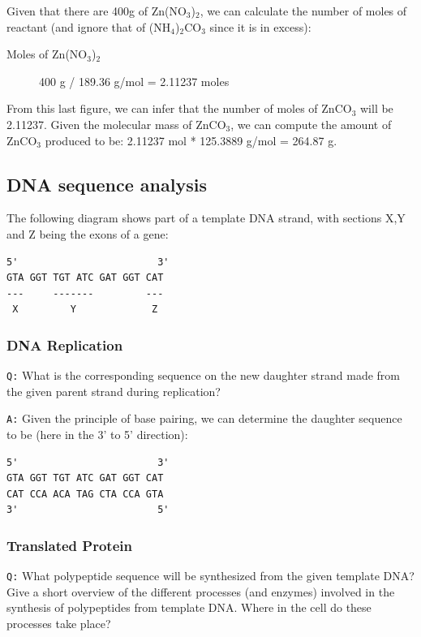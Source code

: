 \documentclass[11pt, a4paper,titlepage]{article}
\begin{document}
Given that there are 400g of Zn(NO$_{3}$)$_{2}$, we can calculate the
number of moles of reactant (and ignore that of (NH$_{4}$)$_{2}$CO$_{3}$
since it is in excess):

\begin{description}
\item[Moles of Zn(NO$_{3}$)$_{2}$] 400 g / 189.36 g/mol = 2.11237 moles
\end{description}

From this last figure, we can infer that the number of moles of
ZnCO$_{3}$ will be 2.11237. Given the molecular mass of ZnCO$_{3}$, we can
compute the amount of ZnCO$_{3}$ produced to be: 2.11237 mol * 125.3889
g/mol = 264.87 g.
\subsection{DNA sequence analysis}
\label{sec-1-2}


The following diagram shows part of a template DNA strand, with
sections X,Y and Z being the exons of a gene:


\begin{verbatim}
5'                        3'
GTA GGT TGT ATC GAT GGT CAT
---     -------         ---
 X         Y             Z
\end{verbatim}
\subsubsection{DNA Replication}
\label{sec-1-2-1}

\texttt{Q:} What is the corresponding sequence on the new daughter strand
made from the given parent strand during replication?

\texttt{A:} Given the principle of base pairing, we can determine the daughter
sequence to be (here in the 3' to 5' direction):


\begin{verbatim}
5'                        3'
GTA GGT TGT ATC GAT GGT CAT
CAT CCA ACA TAG CTA CCA GTA
3'                        5'
\end{verbatim}
\subsubsection{Translated Protein}
\label{sec-1-2-2}

\texttt{Q:} What polypeptide sequence will be synthesized from the given template
DNA? Give a short overview of the different processes (and enzymes)
involved in the synthesis of polypeptides from template DNA. Where in
the cell do these processes take place?
\end{document}
